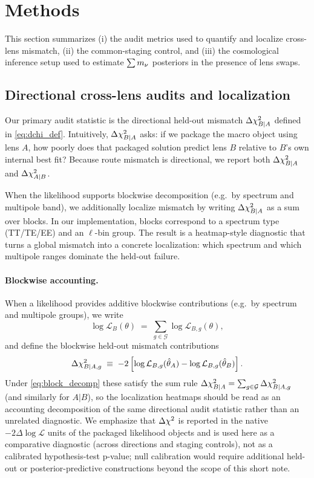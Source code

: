\section{Methods}
\label{sec:methods}

This section summarizes (i) the audit metrics used to quantify and localize cross-lens mismatch, (ii) the common-staging control, and (iii) the cosmological inference setup used to estimate $\sum m_\nu$ posteriors in the presence of lens swaps.

\subsection{Directional cross-lens audits and localization}
\label{sec:audit-metrics}

Our primary audit statistic is the directional held-out mismatch $\Delta \chi^2_{B|A}$ defined in \cref{eq:dchi_def}. Intuitively, $\Delta \chi^2_{B|A}$ asks: if we package the macro object using lens $A$, how poorly does that packaged solution predict lens $B$ relative to $B$'s own internal best fit? Because route mismatch is directional, we report both $\Delta \chi^2_{B|A}$ and $\Delta \chi^2_{A|B}$.

When the likelihood supports blockwise decomposition (e.g.\ by spectrum and multipole band), we additionally localize mismatch by writing $\Delta \chi^2_{B|A}$ as a sum over blocks. In our implementation, blocks correspond to a spectrum type (TT/TE/EE) and an $\ell$-bin group. The result is a heatmap-style diagnostic that turns a global mismatch into a concrete localization: which spectrum and which multipole ranges dominate the held-out failure.

\paragraph{Blockwise accounting.}
When a likelihood provides additive blockwise contributions (e.g.\ by spectrum and multipole groups), we write
\begin{equation}
  \log \mathcal{L}_B(\theta) \;=\; \sum_{g\in\mathcal{G}} \log \mathcal{L}_{B,g}(\theta),
  \label{eq:block_decomp}
\end{equation}
and define the blockwise held-out mismatch contributions
\begin{equation}
  \Delta \chi^2_{B|A,g} \;\equiv\; -2\left[\log \mathcal{L}_{B,g}(\hat\theta_A) - \log \mathcal{L}_{B,g}(\hat\theta_B)\right].
  \label{eq:block_dchi}
\end{equation}
Under \cref{eq:block_decomp} these satisfy the sum rule $\Delta \chi^2_{B|A}=\sum_{g\in\mathcal{G}}\Delta \chi^2_{B|A,g}$ (and similarly for $A|B$), so the localization heatmaps should be read as an accounting decomposition of the same directional audit statistic rather than an unrelated diagnostic.
We emphasize that $\Delta \chi^2$ is reported in the native $-2\Delta\log\mathcal{L}$ units of the packaged likelihood objects and is used here as a comparative diagnostic (across directions and staging controls), not as a calibrated hypothesis-test p-value; null calibration would require additional held-out or posterior-predictive constructions beyond the scope of this short note.

